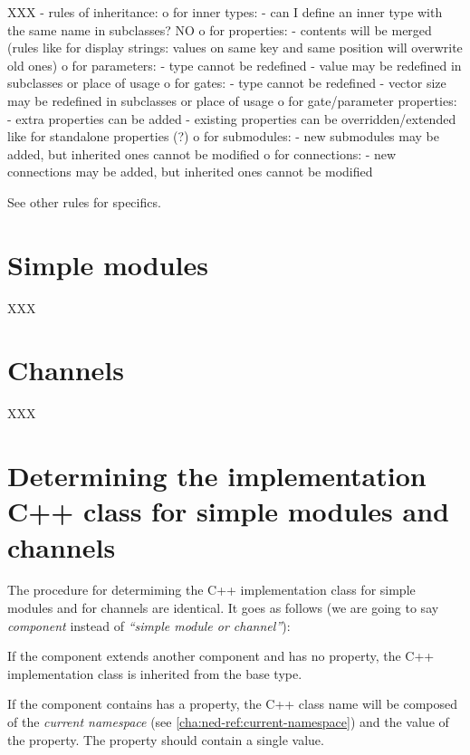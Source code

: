 XXX
- rules of inheritance:
    o for inner types:
       - can I define an inner type with the same name in subclasses? NO
    o for properties:
       - contents will be merged (rules like for display strings: values on
         same key and same position will overwrite old ones)
    o for parameters:
       - type cannot be redefined
       - value may be redefined in subclasses or place of usage
    o for gates:
       - type cannot be redefined
       - vector size may be redefined in subclasses or place of usage
    o for gate/parameter properties:
       - extra properties can be added
       - existing properties can be overridden/extended like for standalone properties (?)
    o for submodules:
       - new submodules may be added, but inherited ones cannot be modified
    o for connections:
       - new connections may be added, but inherited ones cannot be modified

See other rules for specifics.

\section{Simple modules}

XXX

\section{Channels}

XXX

\section[C++ class for simple modules/channels]{Determining the implementation
C++ class for simple modules and channels}

The procedure for determiming the C++ implementation class for simple modules
and for channels are identical. It goes as follows (we are going to say
\textit{component} instead of \textit{``simple module or channel''}):

If the component extends another component and has no
 property, the C++ implementation class is inherited from the base
type.

If the component contains has a  property, the C++ class
name will be composed of the \textit{current namespace} (see
\ref{cha:ned-ref:current-namespace}) and the value of the 
property. The  property should contain a single value.

